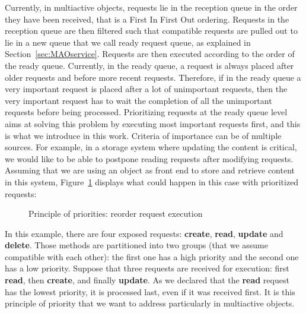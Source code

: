 \documentclass[11pt]{report}
\begin{document}
Currently, in multiactive objects, requests lie in the reception queue in the order they have been received, that is a First In First Out ordering. Requests in the reception queue are then filtered such that compatible requests are pulled out to lie in a new queue that we call ready request queue, as explained in Section~\ref{sec:MAOservice}. Requests are then executed according to the order of the ready queue. Currently, in the ready queue, a request is always placed after older requests and before more recent requests. Therefore, if in the ready queue a very important request is placed after a lot of unimportant requests, then the very important request has to wait the completion of all the unimportant requests before being processed. Prioritizing requests at the ready queue level aims at solving this problem by executing most important requests first, and this is what we introduce in this work. Criteria of importance can be of multiple sources. For example, in a storage system where updating the content is critical, we would like to be able to postpone reading requests after modifying requests. Assuming that we are using an object as front end to store and retrieve content in this system, Figure~\ref{fig:priority_principle} displays what could happen in this case with prioritized requests:

\begin{figure}[ht]
      \caption{Principle of priorities: reorder request execution}
      \label{fig:priority_principle}
\end{figure}

In this example, there are four exposed requests: \textbf{create}, \textbf{read}, \textbf{update} and \textbf{delete}. Those methods are partitioned into two groups (that we assume compatible with each other): the first one has a high priority and the second one has a low priority. Suppose that three requests are received for execution: first \textbf{read}, then \textbf{create}, and finally \textbf{update}. As we declared that the \textbf{read} request has the lowest priority, it is processed last, even if it was received first. It is this principle of priority that we want to address particularly in multiactive objects.
\end{document}
